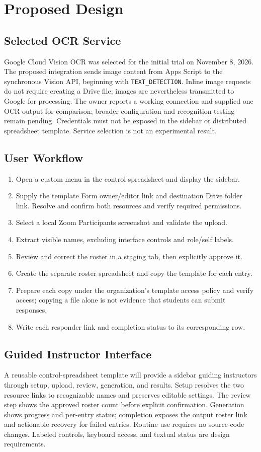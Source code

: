 \section{Proposed Design}
\subsection{Selected OCR Service}
Google Cloud Vision OCR was selected for the initial trial on November 8, 2026.
The proposed integration sends image content from Apps Script to the synchronous
Vision API, beginning with \texttt{TEXT\_DETECTION}. Inline image requests do not
require creating a Drive file; images are nevertheless transmitted to Google
for processing\cite{googleCloudVisionOcr}. The owner reports a working connection
and supplied one OCR output for comparison; broader configuration and recognition
testing remain pending. Credentials must not be exposed in
the sidebar or distributed spreadsheet template. Service selection is not an
experimental result.

\subsection{User Workflow}
\begin{enumerate}
\item Open a custom menu in the control spreadsheet and display the sidebar.
\item Supply the template Form owner/editor link and destination Drive folder
link. Resolve and confirm both resources and verify required permissions.
\item Select a local Zoom Participants screenshot and validate the upload.
\item Extract visible names, excluding interface controls and role/self labels.
\item Review and correct the roster in a staging tab, then explicitly approve it.
\item Create the separate roster spreadsheet and copy the template for each entry.
\item Prepare each copy under the organization's template access policy and verify access;
copying a file alone is not evidence that students can submit responses.
\item Write each responder link and completion status to its corresponding row.
\end{enumerate}

\subsection{Guided Instructor Interface}
A reusable control-spreadsheet template will provide a sidebar guiding instructors
through setup, upload, review, generation, and results. Setup resolves the two
resource links to recognizable names and preserves editable settings. The review
step shows the approved roster count before explicit confirmation. Generation
shows progress and per-entry status; completion exposes the output roster link
and actionable recovery for failed entries. Routine use requires no source-code
changes. Labeled controls, keyboard access, and textual status are design requirements.

